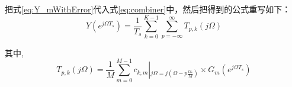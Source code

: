 		把式\ref{eq:Y_mWithError}代入式\ref{eq:combiner}中，然后把得到的公式重写如下：
			 \begin{equation}
				Y\left( {{e^{j\Omega {T_s}}}} \right) = \frac{1}{{{T_s}}}\sum\limits_{k = 0}^{K - 1} {\sum\limits_{p =  - \infty }^\infty  {{T_{p,k}}\left( {j\Omega } \right)} }  \label{eq:YwithError}
			\end{equation}
			
		其中,
			\begin{equation}
				{T_{p,k}}\left( {j\Omega } \right) = \frac{1}{M}\sum\limits_{m = 0}^{M - 1} {{c_{k,m}}} \left| {_{j\Omega  = j\left( {\Omega  - p\frac{{{\Omega _s}}}{M}} \right)}} \right. \times {G_m}\left( {{e^{j\Omega {T_s}}}} \right)
			\end{equation}
		
		
		
		
	
	
	